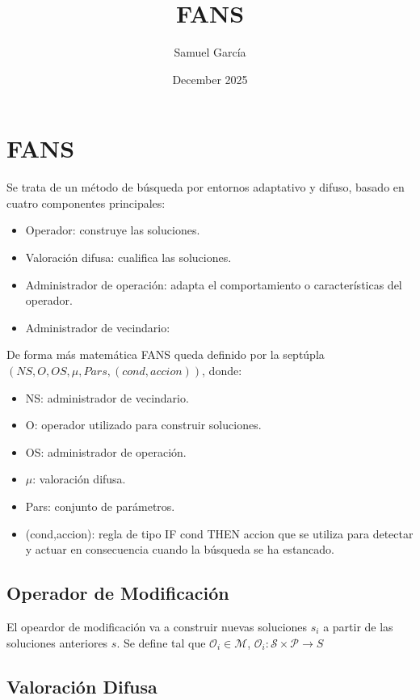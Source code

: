 \documentclass{article}
\title{FANS}
\author{Samuel García}
\date{December 2025}
\begin{document}
\maketitle

\section{FANS}

Se trata de un método de búsqueda por entornos adaptativo y difuso, basado en cuatro componentes principales:
\begin{itemize}
    \item Operador: construye las soluciones.
    \item Valoración difusa: cualifica las soluciones.
    \item Administrador de operación: adapta el comportamiento o características del operador.
    \item Administrador de vecindario: 
\end{itemize}

De forma más matemática FANS queda definido por la septúpla $(NS,O,OS,\mu,Pars,(cond,accion))$, donde:
\begin{itemize}
    \item NS: administrador de vecindario.
    \item O: operador utilizado para construir soluciones.
    \item OS: administrador de operación.
    \item $\mu$: valoración difusa.
    \item Pars: conjunto de parámetros.
    \item (cond,accion): regla de tipo IF cond THEN accion que se utiliza para detectar y actuar en consecuencia cuando la búsqueda se ha estancado.
\end{itemize}

\subsection{Operador de Modificación}
El opeardor de modificación va a construir nuevas soluciones $s_i$ a partir de las soluciones anteriores $s$. Se define tal que $\mathcal{O}_i \in \mathcal{M}$, $\mathcal{O}_i : \mathcal{S} \times \mathcal{P} \rightarrow S$


\subsection{Valoración Difusa}
\end{document}
